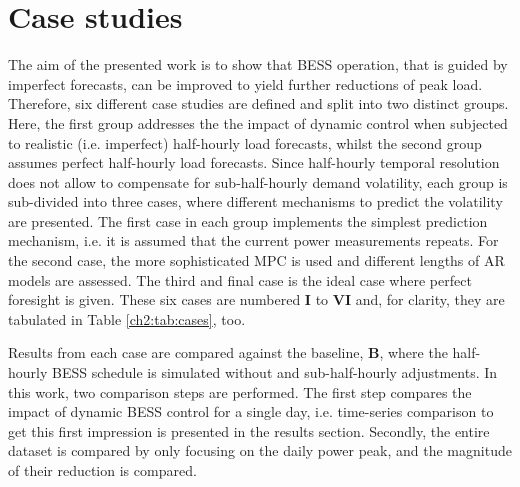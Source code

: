 \section{Case studies}
\label{ch2:sec:case-studies}

The aim of the presented work is to show that BESS operation, that is guided by imperfect forecasts, can be improved to yield further reductions of peak load.
Therefore, six different case studies are defined and split into two distinct groups.
Here, the first group addresses the the impact of dynamic control when subjected to realistic (i.e. imperfect) half-hourly load forecasts, whilst the second group assumes perfect half-hourly load forecasts.
Since half-hourly temporal resolution does not allow to compensate for sub-half-hourly demand volatility, each group is sub-divided into three cases, where different mechanisms to predict the volatility are presented.
The first case in each group implements the simplest prediction mechanism, i.e. it is assumed that the current power measurements repeats.
For the second case, the more sophisticated MPC is used and different lengths of AR models are assessed.
The third and final case is the ideal case where perfect foresight is given.
These six cases are numbered \textbf{I} to \textbf{VI} and, for clarity, they are tabulated in Table \ref{ch2:tab:cases}, too.



Results from each case are compared against the baseline, \textbf{B}, where the half-hourly BESS schedule is simulated without and sub-half-hourly adjustments.
In this work, two comparison steps are performed.
The first step compares the impact of dynamic BESS control for a single day, i.e. time-series comparison to get this first impression is presented in the results section.
Secondly, the entire dataset is compared by only focusing on the daily power peak, and the magnitude of their reduction is compared.